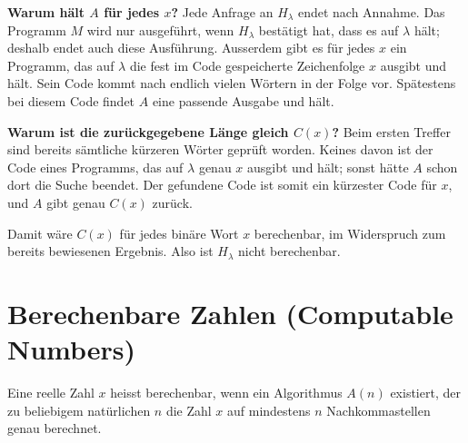 \begin{mytheorem}
\begin{myproof}
		\textbf{Warum hält $A$ für jedes $x$?} Jede Anfrage an $H_\lambda$ endet nach Annahme. Das Programm $M$ wird nur ausgeführt, wenn $H_\lambda$ bestätigt hat, dass es auf $\lambda$ hält; deshalb endet auch diese Ausführung. Ausserdem gibt es für jedes $x$ ein Programm, das auf $\lambda$ die fest im Code gespeicherte Zeichenfolge $x$ ausgibt und hält. Sein Code kommt nach endlich vielen Wörtern in der Folge vor. Spätestens bei diesem Code findet $A$ eine passende Ausgabe und hält.

		\textbf{Warum ist die zurückgegebene Länge gleich $C(x)$?} Beim ersten Treffer sind bereits sämtliche kürzeren Wörter geprüft worden. Keines davon ist der Code eines Programms, das auf $\lambda$ genau $x$ ausgibt und hält; sonst hätte $A$ schon dort die Suche beendet. Der gefundene Code ist somit ein kürzester Code für $x$, und $A$ gibt genau $C(x)$ zurück.

		Damit wäre $C(x)$ für jedes binäre Wort $x$ berechenbar, im Widerspruch zum bereits bewiesenen Ergebnis. Also ist $H_\lambda$ nicht berechenbar.
	\end{myproof}
\end{mytheorem}


\section{Berechenbare Zahlen (Computable Numbers)}
\begin{mydefinition}\label{mydefinition:comp_numb}
	Eine reelle Zahl $x$ heisst berechenbar, wenn ein Algorithmus $A(n)$ existiert, der zu beliebigem natürlichen $n$ die Zahl $x$ auf mindestens $n$ Nachkommastellen genau berechnet.
\end{mydefinition}

